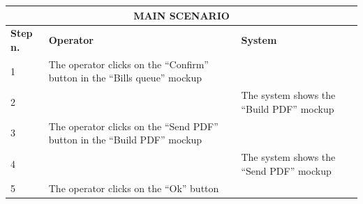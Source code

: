 {{{\begin{center}
			\begin{tabular}{|p{2cm}|p{6cm}|p{6cm}|}
			\hline
				\multicolumn{3}{|c|}{MAIN SCENARIO}\\
			\hline
				\centering \vspace{1mm} \bfseries{Step n.} \vspace{1mm} & \vspace{1mm} \bfseries{Operator} \vspace{1mm} & \vspace{1mm} \bfseries{System} \vspace{1mm}\\
			\hline
				\vspace{1mm} 1 \vspace{1mm} &
				\vspace{1mm} The operator clicks on the “Confirm” button in the “Bills queue” mockup \vspace{1mm} & 
				\vspace{1mm} \vspace{1mm} \\
			\hline
				\vspace{1mm} 2 \vspace{1mm} &
				\vspace{1mm} \vspace{1mm} & 
				\vspace{1mm} The system shows the “Build PDF” mockup \vspace{1mm} \\
			\hline
				\vspace{1mm} 3 \vspace{1mm} &
				\vspace{1mm} The operator clicks on the “Send PDF” button in the “Build PDF” mockup \vspace{1mm} & 
				\vspace{1mm} \vspace{1mm} \\
			\hline
				\vspace{1mm} 4 \vspace{1mm} &
				\vspace{1mm} \vspace{1mm} & 
				\vspace{1mm} The system shows the “Send PDF” mockup \vspace{1mm} \\
			\hline
				\vspace{1mm} 5 \vspace{1mm} &
				\vspace{1mm} The operator clicks on the “Ok” button \vspace{1mm} & 

\end{tabular}
\end{center}}}}
